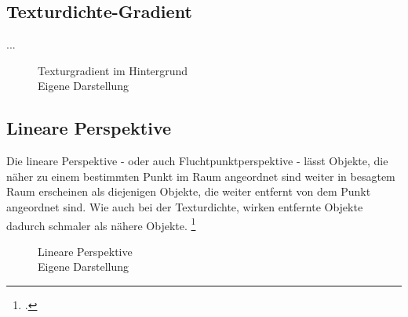 \subsection{Texturdichte-Gradient}
...
\begin{figure}[!ht]
\centering
{}
\caption[Texturgradient im Hintergrund]{Texturgradient im Hintergrund\\ Eigene Darstellung}
\label{sample_texturgradient}
\end{figure}


\subsection{Lineare Perspektive}
Die lineare Perspektive - oder auch Fluchtpunktperspektive - lässt Objekte, die näher zu einem bestimmten Punkt im Raum angeordnet sind weiter in besagtem Raum erscheinen als diejenigen Objekte, die weiter entfernt von dem Punkt angeordnet sind. Wie auch bei der Texturdichte, wirken entfernte Objekte dadurch schmaler als nähere Objekte. \footcite[Vgl.]{Ans17 u. Ass16}

\begin{figure}[!ht]
\centering
{}
\caption[Lineare Perspektive]{Lineare Perspektive\\ Eigene Darstellung}
\label{sample_lineare_perspektive}
\end{figure}

